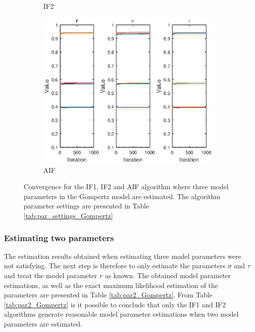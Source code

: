 \documentclass[twoside,openright]{report}
\begin{document}
\begin{figure}
\begin{subfigure}[b]{0.7\textwidth}
            \caption[]%
            { \small IF2 }     
            \label{fig:mean and std of net24}
        \end{subfigure}
        \begin{subfigure}[b]{0.7\textwidth}   
            \centering 
            \includegraphics[width=\textwidth]{./fig_gompertz/AIF_3_par}
            \caption[]%
            { \small AIF } 
            \label{fig:mean and std of net34}
        \end{subfigure}
        \caption[ ]
        {\small Convergence for the IF1, IF2 and AIF algorithm where three model parameters in the Gompertz model are estimated. The algorithm parameter settings  are presented in Table \ref{tab:par_settings_Gompertz} }
        \label{fig:cov_three_par}
\end{figure}

\subsubsection{Estimating two parameters}

The estimation results obtained when estimating three model parameters were not satisfying. The next step is therefore to only estimate the parameters $\sigma$ and $\tau$ and treat the model parameter $r$ as known. The obtained model parameter estimations, as well as the exact maximum likelihood estimation of the parameters are presented in Table \ref{tab:par2_Gompertz}. From Table \ref{tab:par2_Gompertz} is it  possible to conclude that only the IF1 and IF2 algorithms  generate reasonable model parameter estimations when two model parameters are estimated. 
\end{document}
